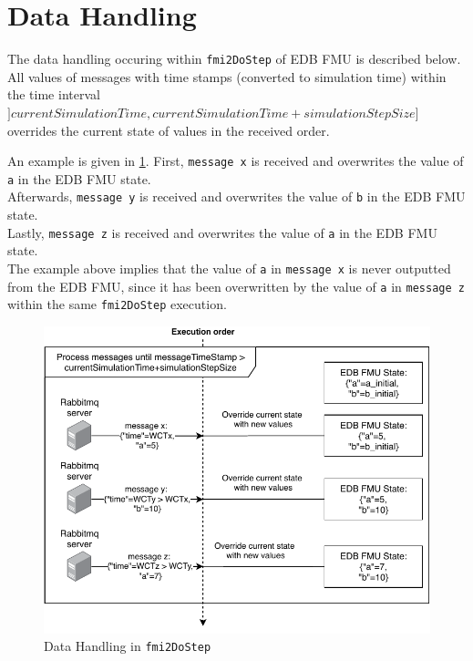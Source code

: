 \section{Data Handling}\label{sec:data_handling}
The data handling occuring within \texttt{fmi2DoStep} of EDB FMU is described
below.
All values of messages with time stamps (converted to simulation time) within the
time interval $]currentSimulationTime,currentSimulationTime + simulationStepSize]$
overrides the current state of values in the received order.

An example is given in \cref{fig:data-handling-dostep}.
First, \texttt{message x} is received and overwrites the value of \texttt{a} in the EDB FMU state.\\
Afterwards, \texttt{message y} is received and overwrites the value of \texttt{b} in
the EDB FMU state.\\
Lastly, \texttt{message z} is received and overwrites the value of
\texttt{a} in the EDB FMU state. \\
The example above implies that the value of \texttt{a} in \texttt{message x}  is never
outputted from the EDB FMU, since it has been overwritten by the value of
\texttt{a} in \texttt{message z} within the same \texttt{fmi2DoStep} execution.

\begin{figure}[htb]
  \centering
  \includegraphics[width=\textwidth]{figures/datahandling.pdf}
  \caption{Data Handling in \texttt{fmi2DoStep}}
  \label{fig:data-handling-dostep}
\end{figure}

